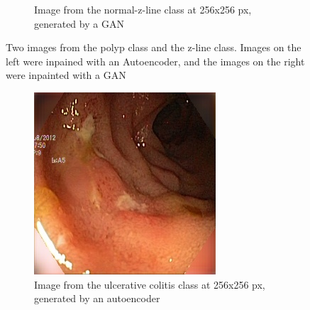 \begin{figure}
\begin{subfigure}[t]{0.4\textwidth}
            \caption{Image from the normal-z-line class at 256x256 px, generated by a GAN }    
            \label{fig:z_GAN_CORNER1}
        \end{subfigure}
        \caption{Two images from the polyp class and the z-line class. Images on the left were inpained with an Autoencoder, and the images on the right were inpainted with a GAN} 
        \label{fig:AE_GAN_CORNER1}
    \end{figure}
    
        \begin{figure}
        \centering
        \begin{subfigure}[t]{0.4\textwidth}
            \centering
            \includegraphics[width=\textwidth]{experiments/figures/blackcorner/ucAE.jpg}
            \caption{ Image from the ulcerative colitis class at 256x256 px, generated by an autoencoder }    
            \label{fig:polyp_AE_CORNER2}
        \end{subfigure}
        \qquad
        \begin{subfigure}[t]{0.4\textwidth}  
            \centering 

\end{subfigure}
\end{figure}
